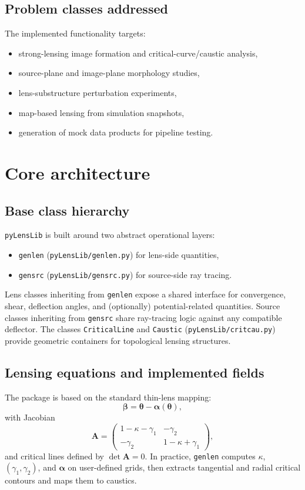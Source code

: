 \documentclass{aa}
\newcommand{\pylenslib}{\texttt{pyLensLib}\xspace}
\begin{document}
\subsection{Problem classes addressed}
The implemented functionality targets:
\begin{itemize}
\item strong-lensing image formation and critical-curve/caustic analysis,
\item source-plane and image-plane morphology studies,
\item lens-substructure perturbation experiments,
\item map-based lensing from simulation snapshots,
\item generation of mock data products for pipeline testing.
\end{itemize}

\section{Core architecture}
\subsection{Base class hierarchy}
\pylenslib is built around two abstract operational layers:
\begin{itemize}
\item \texttt{genlen} (\texttt{pyLensLib/genlen.py}) for lens-side quantities,
\item \texttt{gensrc} (\texttt{pyLensLib/gensrc.py}) for source-side ray tracing.
\end{itemize}

Lens classes inheriting from \texttt{genlen} expose a shared interface for convergence, shear, deflection angles, and (optionally) potential-related quantities. Source classes inheriting from \texttt{gensrc} share ray-tracing logic against any compatible deflector. The classes \texttt{CriticalLine} and \texttt{Caustic} (\texttt{pyLensLib/critcau.py}) provide geometric containers for topological lensing structures.

\subsection{Lensing equations and implemented fields}
The package is based on the standard thin-lens mapping:
\begin{equation}
\boldsymbol{\beta} = \boldsymbol{\theta} - \boldsymbol{\alpha}(\boldsymbol{\theta}),
\end{equation}
with Jacobian
\begin{equation}
\mathbf{A} =
\begin{pmatrix}
1-\kappa-\gamma_1 & -\gamma_2 \\
-\gamma_2 & 1-\kappa+\gamma_1
\end{pmatrix},
\end{equation}
and critical lines defined by $\det \mathbf{A}=0$. In practice, \texttt{genlen} computes $\kappa$, $(\gamma_1,\gamma_2)$, and $\boldsymbol{\alpha}$ on user-defined grids, then extracts tangential and radial critical contours and maps them to caustics.
\end{document}
